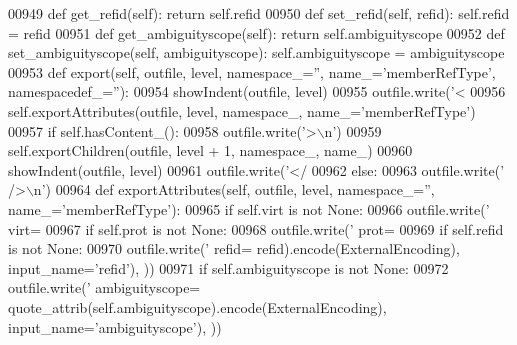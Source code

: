 \begin{DoxyCode}
{{{{{{{{{{{{{{{{{{{{{{{{{{{{{{{{{{{{{00949     \textcolor{keyword}{def }get_refid(self): \textcolor{keywordflow}{return} self.refid
00950     \textcolor{keyword}{def }set_refid(self, refid): self.refid = refid
00951     \textcolor{keyword}{def }get_ambiguityscope(self): \textcolor{keywordflow}{return} self.ambiguityscope
00952     \textcolor{keyword}{def }set_ambiguityscope(self, ambiguityscope): self.ambiguityscope = ambiguityscope
00953     \textcolor{keyword}{def }export(self, outfile, level, namespace\_='', name\_='memberRefType', namespacedef\_=''):
00954         showIndent(outfile, level)
00955         outfile.write(\textcolor{stringliteral}{'<%
00956         self.exportAttributes(outfile, level, namespace\_, name\_=\textcolor{stringliteral}{'memberRefType'})
00957         \textcolor{keywordflow}{if} self.hasContent_():
00958             outfile.write(\textcolor{stringliteral}{'>\(\backslash\)n'})
00959             self.exportChildren(outfile, level + 1, namespace\_, name\_)
00960             showIndent(outfile, level)
00961             outfile.write(\textcolor{stringliteral}{'</%
00962         \textcolor{keywordflow}{else}:
00963             outfile.write(\textcolor{stringliteral}{' />\(\backslash\)n'})
00964     \textcolor{keyword}{def }exportAttributes(self, outfile, level, namespace\_='', name\_='memberRefType'):
00965         \textcolor{keywordflow}{if} self.virt \textcolor{keywordflow}{is} \textcolor{keywordflow}{not} \textcolor{keywordtype}{None}:
00966             outfile.write(\textcolor{stringliteral}{' virt=%
00967         \textcolor{keywordflow}{if} self.prot \textcolor{keywordflow}{is} \textcolor{keywordflow}{not} \textcolor{keywordtype}{None}:
00968             outfile.write(\textcolor{stringliteral}{' prot=%
00969         \textcolor{keywordflow}{if} self.refid \textcolor{keywordflow}{is} \textcolor{keywordflow}{not} \textcolor{keywordtype}{None}:
00970             outfile.write(\textcolor{stringliteral}{' refid=%
      refid).encode(ExternalEncoding), input\_name=\textcolor{stringliteral}{'refid'}), ))
00971         \textcolor{keywordflow}{if} self.ambiguityscope \textcolor{keywordflow}{is} \textcolor{keywordflow}{not} \textcolor{keywordtype}{None}:
00972             outfile.write(\textcolor{stringliteral}{' ambiguityscope=%
      quote_attrib(self.ambiguityscope).encode(ExternalEncoding), input\_name=\textcolor{stringliteral}{'ambiguityscope'}), ))
}}}}}}}}}}}}}}}}}}}}}}}}}}}}}}}}}}}}}}}}}}}
\end{DoxyCode}
